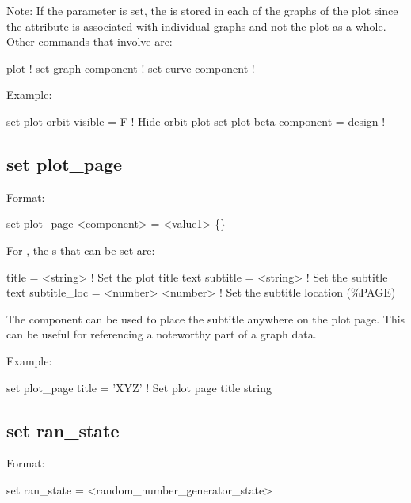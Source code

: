{{Note: If the  parameter is set, the  is stored in each of the graphs of
the plot since the  attribute is associated with individual graphs and not the plot as
a whole. Other commands that involve  are:
\begin{example}
  plot                    ! 
  set graph component     ! 
  set curve component     ! 
\end{example}

Example:
\begin{example}
  set plot orbit visible = F        ! Hide orbit plot
  set plot beta component = design  ! 
\end{example}


\subsection{set plot\_page}
\label{s:set.plot.page}

Format:
\begin{example}
  set plot_page <component> = <value1> \{<value2>\}
\end{example}

For , the s that can be set are:
\begin{example}
  title        = <string>          ! Set the plot title text
  subtitle     = <string>          ! Set the subtitle text
  subtitle_loc = <number> <number> ! Set the subtitle location (\%PAGE)
\end{example}
The  component can be used to place the subtitle anywhere on the plot
page. This can be useful for referencing a noteworthy part of a graph data.

Example:
\begin{example}
  set plot_page title = 'XYZ'  ! Set plot page title string
\end{example}


\subsection{set ran\_state}
\label{s:set.ran.state}

Format:
\begin{example}
  set ran_state = <random_number_generator_state>
\end{example}

}}
